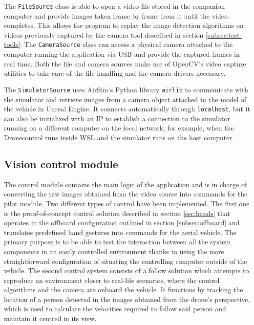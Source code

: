 The \texttt{FileSource} class is able to open a video file stored in the companion computer and provide images taken frame by frame from it until the video completes.
This allows the program to replay the image detection algorithms on videos previously captured by the camera tool described in section \ref{subsec:test-tools}.
The \texttt{CameraSource} class can access a physical camera attached to the computer running the application via USB and provide the captured frames in real time.
Both the file and camera sources make use of OpenCV's video capture utilities to take care of the file handling and the camera drivers necessary.

The \texttt{SimulatorSource} uses AirSim's Python library \texttt{airlib} to communicate with the simulator and retrieve images from a camera object attached to the model of the vehicle in Unreal Engine.
It connects automatically through \texttt{localhost}, but it can also be initialized with an IP to establish a connection to the simulator running on a different computer on the local network; for example, when the Dronecontrol runs inside WSL and the simulator runs on the host computer.

\subsection{Vision control module}
\label{subsec:control-module}
The control module contains the main logic of the application and is in charge of converting the raw images obtained from the video source into commands for the pilot module.
Two different types of control have been implemented.
The first one is the proof-of-concept control solution described in section \ref{sec:hands} that operates in the offboard configuration outlined in section \ref{subsec:offboard} and translates predefined hand gestures into commands for the aerial vehicle.
The primary purpose is to be able to test the interaction between all the system components in an easily controlled environment thanks to using the more straightforward configuration of situating the controlling computer outside of the vehicle.
The second control system consists of a follow solution which attempts to reproduce an environment closer to real-life scenarios, where the control algorithms and the camera are onboard the vehicle.
It functions by tracking the location of a person detected in the images obtained from the drone's perspective, which is used to calculate the velocities required to follow said person and maintain it centred in its view.

